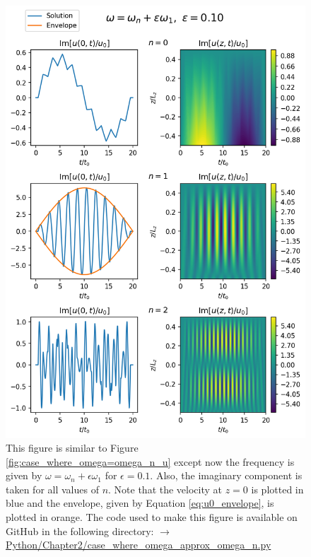 \begin{figure}
    \centering
    \vspace{-30pt}
    \includegraphics[width=\textwidth,height=0.95\textheight,keepaspectratio]{figures/chapter02/case_where_omega_approx_omega_n_u.png}
    \vspace{-10pt}
    \caption{This figure is similar to Figure \ref{fig:case_where_omega=omega_n_u} except now the frequency is given by $\omega=\omega_n+\epsilon \omega_1$ for $\epsilon=0.1$. Also, the imaginary component is taken for all values of $n$. Note that the velocity at $z=0$ is plotted in blue and the envelope, given by Equation \eqref{eq:u0_envelope}, is plotted in orange. The code used to make this figure is available on GitHub in the following directory:\newline
    \href{https://github.com/aleksyprok/apkp_thesis/blob/main/Python/Chapter2/case_where_omega_approx_omega_n.py}{$\rightarrow$ Python/Chapter2/case\_where\_omega\_approx\_omega\_n.py}}
    \label{fig:case_where_omega_approx_omega_n_u}
    \vspace{-30pt}
\end{figure}

